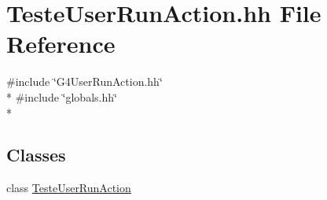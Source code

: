 \hypertarget{_teste_user_run_action_8hh}{\section{Teste\-User\-Run\-Action.\-hh File Reference}
\label{_teste_user_run_action_8hh}
}
{\ttfamily \#include \char`\"{}G4\-User\-Run\-Action.\-hh\char`\"{}}\\*
{\ttfamily \#include \char`\"{}globals.\-hh\char`\"{}}\\*
\subsection*{Classes}
\begin{DoxyCompactItemize}
\item 
class \hyperlink{class_teste_user_run_action}{Teste\-User\-Run\-Action}
\end{DoxyCompactItemize}
